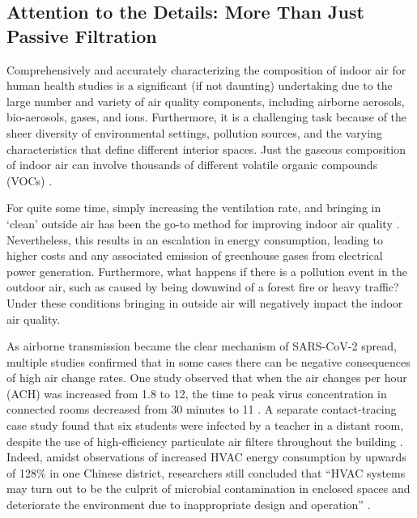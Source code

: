 \documentclass[journal=jacsat,manuscript=article]{achemso}
\begin{document}
\subsection{Attention to the Details: More Than Just Passive Filtration}

Comprehensively and accurately characterizing the composition of indoor air for human health studies is a significant (if not daunting) undertaking due to the large number and variety of air quality components, including airborne aerosols, bio-aerosols, gases, and ions. Furthermore, it is a challenging task because of the sheer diversity of environmental settings, pollution sources, and the varying characteristics that define different interior spaces. Just the gaseous composition of indoor air can involve thousands of different volatile organic compounds (VOCs) \citep{shin2020, choi2016}.

For quite some time, simply increasing the ventilation rate, and bringing in \lq clean' outside air has been the go-to method for improving indoor air quality \citep{drees1992ventilation, Burton1993ASHRAEsIA, Mendell2014BalancingEC, Dutton2015EvaluationOT, Johnson2018IndoorAQ, Lohani2016SmartVentAC, Zhang2022ARO}. Nevertheless, this results in an escalation in energy consumption, leading to higher costs and any associated emission of greenhouse gases from electrical power generation. Furthermore, what happens if there is a pollution event in the outdoor air, such as caused by being downwind of a forest fire or heavy traffic? Under these conditions bringing in outside air will negatively impact the indoor air quality. 

As airborne transmission became the clear mechanism of SARS-CoV-2 spread, multiple studies confirmed that in some cases there can be negative consequences of high air change rates. One study observed that when the air changes per hour (ACH) was increased from 1.8 to 12, the time to peak virus concentration in connected rooms decreased from 30 minutes to 11 \cite{pease_investigation_2021}. A separate contact-tracing case study found that six students were infected by a teacher in a distant room, despite the use of high-efficiency particulate air filters throughout the building \cite{turakhia_ultrafast_2021}. Indeed, amidst observations of increased HVAC energy consumption by upwards of 128\% in one Chinese district, researchers still concluded that “HVAC systems may turn out to be the culprit of microbial contamination in enclosed spaces and deteriorate the environment due to inappropriate design and operation”  \cite{zheng_covid-19_2021}.
\end{document}
